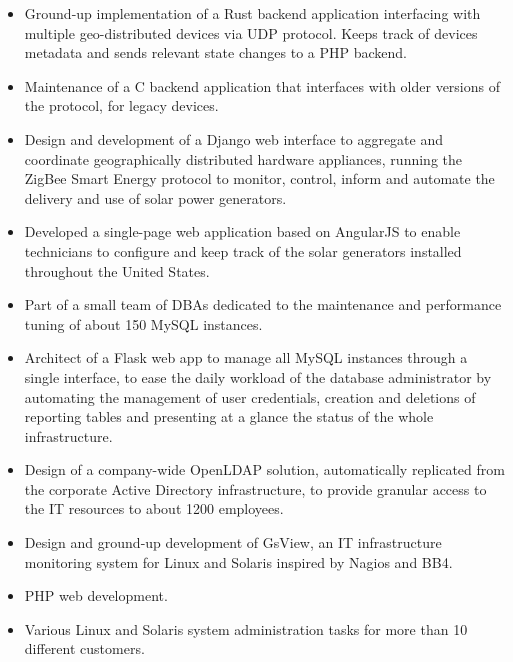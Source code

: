 \documentclass{resume}
\begin{document}

\begin{itemize}
\item Ground-up implementation of a Rust backend application interfacing with multiple geo-distributed devices via UDP protocol. Keeps track of devices metadata and sends relevant state changes to a PHP backend.
\item Maintenance of a C backend application that interfaces with older versions of the protocol, for legacy devices.
\end{itemize}


\begin{itemize}
\item Design and development of a Django web interface to aggregate and coordinate geographically distributed hardware appliances, running the ZigBee Smart Energy protocol to monitor, control, inform and automate the delivery and use of solar power generators.
\item Developed a single-page web application based on AngularJS to enable technicians to configure and keep track of the solar generators installed throughout the United States.
\end{itemize}



\begin{itemize}
\item Part of a small team of DBAs dedicated to the maintenance and performance tuning of about 150 MySQL instances.
\item Architect of a Flask web app to manage all MySQL instances through a single interface, to ease the daily workload of the database administrator by automating the management of user credentials, creation and deletions of reporting tables and presenting at a glance the status of the whole infrastructure.
\item Design of a company-wide OpenLDAP solution, automatically replicated from the corporate Active Directory infrastructure, to provide granular access to the IT resources to about 1200 employees.
\end{itemize}


\begin{itemize}
\item Design and ground-up development of GsView, an IT infrastructure monitoring system for Linux and Solaris inspired by Nagios and BB4.
\item PHP web development.
\item Various Linux and Solaris system administration tasks for more than 10 different
  customers.
\end{itemize}
\end{document}
